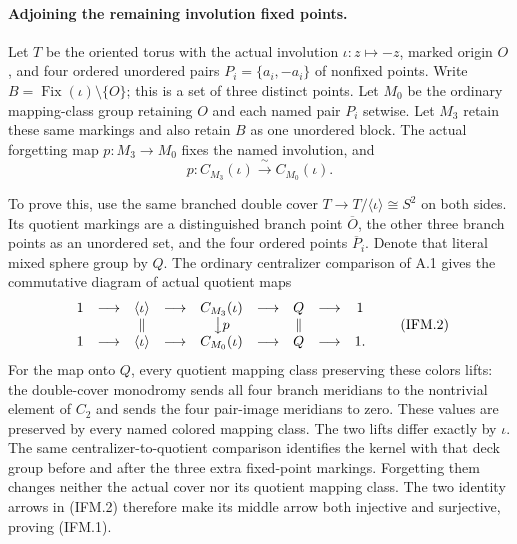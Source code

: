 \paragraph{Adjoining the remaining involution fixed points.}
Let $T$ be the oriented torus with the actual involution
$\iota:z\mapsto-z$, marked origin $O$, and four
ordered unordered pairs $P_i=\{a_i,-a_i\}$ of
nonfixed points.  Write
$B=\operatorname{Fix}(\iota)\setminus\{O\}$;
this is a set of three distinct points.  Let $M_0$
be the ordinary mapping-class group retaining $O$
and each named pair $P_i$ setwise.  Let $M_3$ retain
these same markings and also retain $B$ as one
unordered block.  The actual forgetting map
$p:M_3\to M_0$ fixes the named involution, and
\[
 p:C_{M_3}(\iota)\xrightarrow{\ \sim\ }
                         C_{M_0}(\iota).
 \tag{IFM.1}
\]

To prove this, use the same branched double cover
$T\to T/\langle\iota\rangle\cong S^2$ on both
sides.  Its quotient markings are a distinguished
branch point $\overline O$, the other three branch
points as an unordered set, and the four ordered
points $\overline P_i$.  Denote that literal
mixed sphere group by $Q$.
The ordinary centralizer comparison of A.1 gives
the commutative diagram of actual quotient maps
\[
 \begin{array}{ccccccccc}
 1&\longrightarrow&\langle\iota\rangle
   &\longrightarrow&C_{M_3}(\iota)
   &\longrightarrow&Q&\longrightarrow&1\\
 &&\Vert&&\big\downarrow p&&\Vert\\
 1&\longrightarrow&\langle\iota\rangle
   &\longrightarrow&C_{M_0}(\iota)
   &\longrightarrow&Q&\longrightarrow&1.
 \end{array}                                           \tag{IFM.2}
\]
For the map onto $Q$, every quotient mapping class
preserving these colors lifts: the double-cover
monodromy sends all four branch meridians to the
nontrivial element of $C_2$ and sends the four
pair-image meridians to zero.  These values are
preserved by every named colored mapping class.
The two lifts differ exactly by $\iota$.
The same centralizer-to-quotient comparison identifies
the kernel with that deck group before and after
the three extra fixed-point markings.  Forgetting
them changes neither the actual cover nor its
quotient mapping class.  The two identity arrows
in (IFM.2) therefore make its middle arrow both
injective and surjective, proving (IFM.1).

